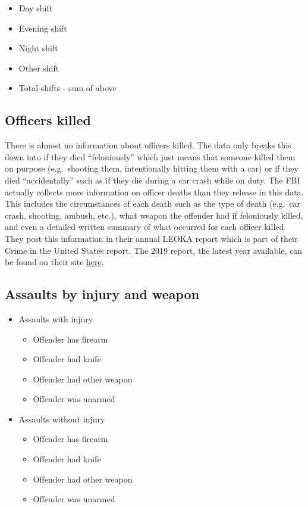\documentclass[
  12pt,
  openany]{book}
\providecommand{\tightlist}{%
  \setlength{\itemsep}{0pt}\setlength{\parskip}{0pt}}
\begin{document}
\begin{itemize}
  \begin{itemize}
  \tightlist
  \item
    Day shift
  \item
    Evening shift
  \item
    Night shift
  \item
    Other shift
  \item
    Total shifts - sum of above
  \end{itemize}
\end{itemize}

\hypertarget{officers-killed}{%
\subsection{Officers killed}\label{officers-killed}}

There is almost no information about officers killed. The data only breaks this down into if they died ``feloniously'' which just means that someone killed them on purpose (e.g.~shooting them, intentionally hitting them with a car) or if they died ``accidentally'' such as if they die during a car crash while on duty. The FBI actually collects more information on officer deaths than they release in this data. This includes the circumstances of each death such as the type of death (e.g.~car crash, shooting, ambush, etc.), what weapon the offender had if feloniously killed, and even a detailed written summary of what occurred for each officer killed. They post this information in their annual LEOKA report which is part of their Crime in the United States report. The 2019 report, the latest year available, can be found on their site \href{https://ucr.fbi.gov/leoka/2019/home}{here}.

\hypertarget{assaults-by-injury-and-weapon}{%
\subsection{Assaults by injury and weapon}\label{assaults-by-injury-and-weapon}}

\begin{itemize}
\tightlist
\item
  Assaults with injury

  \begin{itemize}
  \tightlist
  \item
    Offender has firearm
  \item
    Offender had knife
  \item
    Offender had other weapon
  \item
    Offender was unarmed
  \end{itemize}
\item
  Assaults without injury

  \begin{itemize}
  \tightlist
  \item
    Offender has firearm
  \item
    Offender had knife
  \item
    Offender had other weapon
  \item
    Offender was unarmed
  \end{itemize}
\end{itemize}
\end{document}
